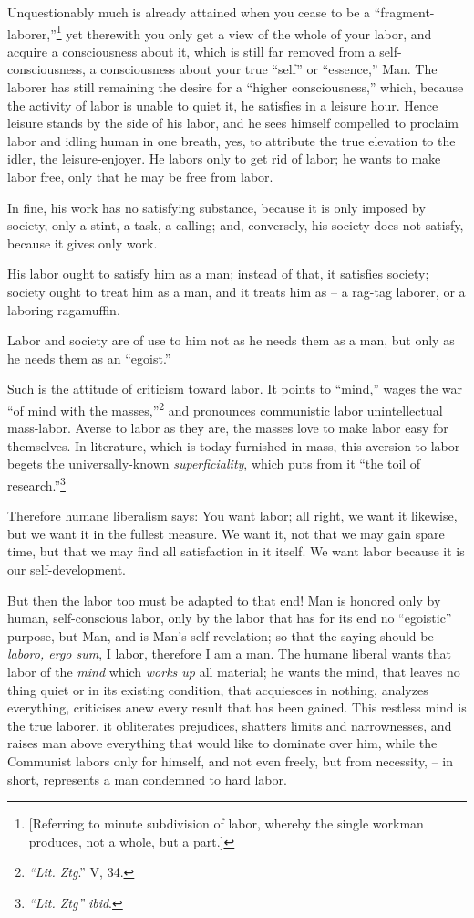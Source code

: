Unquestionably much is already attained when you cease to be a 
``fragment-laborer,''\footnote{[Referring to minute subdivision of labor, 
whereby the single workman produces, not a whole, but a part.]} yet therewith 
you only get a view of the whole of your labor, and acquire a consciousness 
about it, which is still far removed from a self-consciousness, a 
consciousness about your true ``self'' or ``essence,'' Man. The laborer 
has still remaining the desire for a ``higher consciousness,'' which, 
because the activity of labor is unable to quiet it, he satisfies in a leisure 
hour. Hence leisure stands by the side of his labor, and he sees himself 
compelled to proclaim labor and idling human in one breath, yes, to attribute 
the true elevation to the idler, the leisure-enjoyer. He labors only to get 
rid of labor; he wants to make labor free, only that he may be free from 
labor.

In fine, his work has no satisfying substance, because it is only imposed by 
society, only a stint, a task, a calling; and, conversely, his society does 
not satisfy, because it gives only work.

His labor ought to satisfy him as a man; instead of that, it satisfies 
society; society ought to treat him as a man, and it treats him as -- a 
rag-tag laborer, or a laboring ragamuffin.

Labor and society are of use to him not as he needs them as a man, but only as 
he needs them as an ``egoist.''

Such is the attitude of criticism toward labor. It points to ``mind,'' wages 
the war ``of mind with the masses,''\footnote{\textit{``Lit. Ztg}.'' V, 
34.} and pronounces communistic labor unintellectual mass-labor. Averse to 
labor as they are, the masses love to make labor easy for themselves. In 
literature, which is today furnished in mass, this aversion to labor begets 
the universally-known \textit{superficiality}, which puts from it ``the toil 
of research.''\footnote{\textit{``Lit. Ztg''} \textit{ibid}.}

Therefore humane liberalism says: You want labor; all right, we want it 
likewise, but we want it in the fullest measure. We want it, not that we may 
gain spare time, but that we may find all satisfaction in it itself. We want 
labor because it is our self-development.

But then the labor too must be adapted to that end! Man is honored only by 
human, self-conscious labor, only by the labor that has for its end no 
``egoistic'' purpose, but Man, and is Man's self-revelation; so that the 
saying should be \textit{laboro, ergo sum}, I labor, therefore I am a man. The 
humane liberal wants that labor of the \textit{mind} which \textit{works up} 
all material; he wants the mind, that leaves no thing quiet or in its existing 
condition, that acquiesces in nothing, analyzes everything, criticises anew 
every result that has been gained. This restless mind is the true laborer, it 
obliterates prejudices, shatters limits and narrownesses, and raises man above 
everything that would like to dominate over him, while the Communist labors 
only for himself, and not even freely, but from necessity, -- in short, 
represents a man condemned to hard labor.

